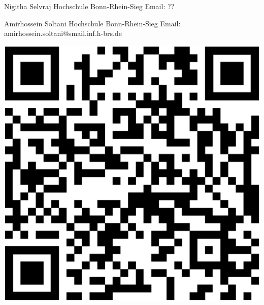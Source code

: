 \documentclass[hbrs-poster.tex]{subfiles}
\begin{document}
    {
        \begin{minipage}{0.75\linewidth}
            Nigitha Selvraj\newline
            Hochschule Bonn-Rhein-Sieg\newline
            Email: ??\newline
        \end{minipage}
        \begin{minipage}{0.75\linewidth}
            Amirhossein Soltani\newline
            Hochschule Bonn-Rhein-Sieg\newline
            Email: amirhossein.soltani@smail.inf.h-brs.de\newline
        \end{minipage}
        \begin{minipage}{0.24\linewidth}
            \vspace{-1.5cm}
            \begin{tikzfigure}
                \includegraphics[scale=0.2]{figures/qrcode.eps}
            \end{tikzfigure}
        \end{minipage}
    }
\end{document}
